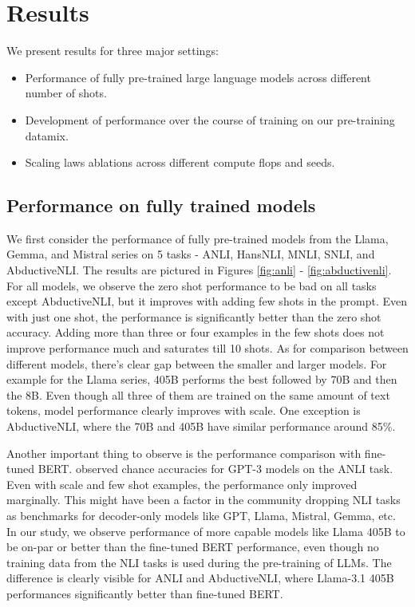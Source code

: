 \section{Results}

We present results for three major settings:
\begin{itemize}
    \item Performance of fully pre-trained large language models across different number of shots.
    \item Development of performance over the course of training on our pre-training datamix.
    \item Scaling laws ablations across different compute flops and seeds.
\end{itemize}

\subsection{Performance on fully trained models}

We first consider the performance of fully pre-trained models from the Llama, Gemma, and Mistral series on 5 tasks - ANLI, HansNLI, MNLI, SNLI, and AbductiveNLI. The results are pictured in Figures \ref{fig:anli} - \ref{fig:abductivenli}. For all models, we observe the zero shot performance to be bad on all tasks except AbductiveNLI, but it improves with adding few shots in the prompt. Even with just one shot, the performance is significantly better than the zero shot accuracy. Adding more than three or four examples in the few shots does not improve performance much and saturates till 10 shots. As for comparison between different models, there's clear gap between the smaller and larger models. For example for the Llama series, 405B performs the best followed by 70B and then the 8B. Even though all three of them are trained on the same amount of text tokens, model performance clearly improves with scale. One exception is AbductiveNLI, where the 70B and 405B have similar performance around 85\%.

Another important thing to observe is the performance comparison with fine-tuned BERT. \citet{brown2020languagemodelsfewshotlearners} observed chance accuracies for GPT-3 models on the ANLI task. Even with scale and few shot examples, the performance only improved marginally. This might have been a factor in the community dropping NLI tasks as benchmarks for decoder-only models like GPT, Llama, Mistral, Gemma, etc. In our study, we observe performance of more capable models like Llama 405B to be on-par or better than the fine-tuned BERT performance, even though no training data from the NLI tasks is used during the pre-training of LLMs. The difference is clearly visible for ANLI and AbductiveNLI, where Llama-3.1 405B performances significantly better than fine-tuned BERT.

